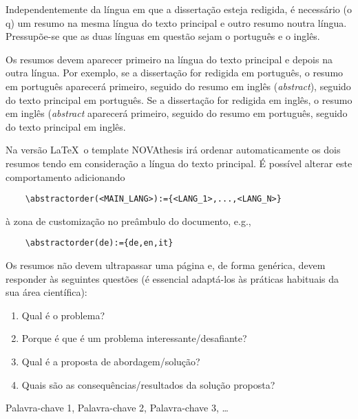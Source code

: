 

Independentemente da língua em que a dissertação esteja redigida, é necessário (o q) \cite{8093778} um resumo na mesma língua do texto principal e outro resumo noutra língua. Pressupõe-se que as duas línguas em questão sejam o português e o inglês.

Os resumos devem aparecer primeiro na língua do texto principal e depois na outra língua. Por exemplo, se a dissertação for redigida em português, o resumo em português aparecerá primeiro, seguido do resumo em inglês (\emph{abstract}), seguido do texto principal em português. Se a dissertação for redigida em inglês, o resumo em inglês (\emph{abstract} aparecerá primeiro, seguido do resumo em português, seguido do texto principal em inglês.

Na versão \LaTeX\, o template NOVAthesis irá ordenar automaticamente os dois resumos tendo em consideração a língua do texto principal. É possível alterar este comportamento adicionando
\begin{verbatim}
    \abstractorder(<MAIN_LANG>):={<LANG_1>,...,<LANG_N>}
\end{verbatim}
\noindent à zona de customização no preâmbulo do documento, e.g.,
\begin{verbatim}
    \abstractorder(de):={de,en,it}
\end{verbatim}

Os resumos não devem ultrapassar uma página e, de forma genérica, devem responder às seguintes questões (é essencial adaptá-los às práticas habituais da sua área científica):

\begin{enumerate}
  \item Qual é o problema?
  \item Porque é que é um problema interessante/desafiante?
  \item Qual é a proposta de abordagem/solução?
  \item Quais são as consequências/resultados da solução proposta?
\end{enumerate}

%
%

\begin{keywords}
Palavra-chave 1, Palavra-chave 2, Palavra-chave 3,  \ldots
\end{keywords}
